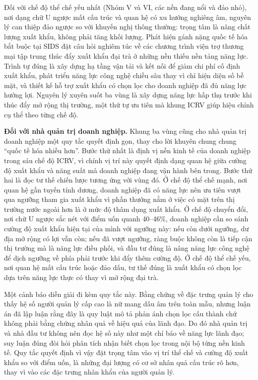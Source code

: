 \documentclass[
  a4paper,
  13pt]{extreport}
\begin{document}
Đối với chế độ thể chế yếu nhất (Nhóm V và VI, các nền đang nổi và đảo
nhỏ), nơi dạng chữ U ngược mất cấu trúc và quan hệ có xu hướng nghiêng
âm, nguyên lý can thiệp đảo ngược so với khuyến nghị thông thường: trọng
tâm là nâng chất lượng xuất khẩu, không phải tăng khối lượng. Phát hiện
gánh nặng quốc tế hóa bắt buộc tại SIDS đặt câu hỏi nghiêm túc về các
chương trình viện trợ thương mại tập trung thúc đẩy xuất khẩu đại trà ở
những nền thiếu nền tảng năng lực. Trình tự đúng là xây dựng hạ tầng vận
tải và kết nối để giảm chi phí cố định xuất khẩu, phát triển năng lực
công nghệ chiều sâu thay vì chỉ hiện diện số bề mặt, và thiết kế hỗ trợ
xuất khẩu có chọn lọc cho doanh nghiệp đã đủ năng lực hưởng lợi. Nguyên
lý xuyên suốt ba vùng là xây dựng năng lực hấp thụ trước khi thúc đẩy mở
rộng thị trường, một thứ tự ưu tiên mà khung ICRV giúp hiệu chỉnh cụ thể
theo từng chế độ.

\textbf{Đối với nhà quản trị doanh nghiệp.} Khung ba vùng cũng cho nhà
quản trị doanh nghiệp một quy tắc quyết định gọn, thay cho lời khuyên
chung chung ``quốc tế hóa nhiều hơn''. Bước thứ nhất là định vị nền kinh
tế của doanh nghiệp trong sáu chế độ ICRV, vì chính vị trí này quyết
định dạng quan hệ giữa cường độ xuất khẩu và năng suất mà doanh nghiệp
đang vận hành bên trong. Bước thứ hai là đọc tư thế chiến lược tương ứng
với vùng đó. Ở chế độ thể chế mạnh, nơi quan hệ gần tuyến tính dương,
doanh nghiệp đã có năng lực nên ưu tiên vượt qua ngưỡng tham gia xuất
khẩu vì phần thưởng nằm ở việc có mặt trên thị trường nước ngoài hơn là
ở mức độ thâm dụng xuất khẩu. Ở chế độ chuyển đổi, nơi chữ U ngược sắc
nét với điểm uốn quanh 40--46\%, doanh nghiệp cần so sánh cường độ xuất
khẩu hiện tại của mình với ngưỡng này: nếu còn dưới ngưỡng, dư địa mở
rộng có lợi vẫn còn; nếu đã vượt ngưỡng, ràng buộc không còn là tiếp cận
thị trường mà là năng lực điều phối, và đầu tư đúng là nâng năng lực
công nghệ để dịch ngưỡng về phía phải trước khi đẩy thêm cường độ. Ở chế
độ thể chế yếu, nơi quan hệ mất cấu trúc hoặc đảo dấu, tư thế đúng là
xuất khẩu có chọn lọc dựa trên năng lực thực có thay vì mở rộng đại trà.

Một cảnh báo diễn giải đi kèm quy tắc này. Bằng chứng về đặc trưng quản
lý cho thấy hệ số người quản lý cấp cao là nữ mang dấu âm trên toàn mẫu,
nhưng luận án đã lập luận rằng đây là quy luật mô tả phản ánh chọn lọc
cấu thành chứ không phải bằng chứng nhân quả về hiệu quả của lãnh đạo.
Do đó nhà quản trị và nhà đầu tư không nên đọc hệ số này như một chỉ báo
về năng lực lãnh đạo; suy luận đúng đòi hỏi phân tích nhận biết chọn lọc
trong nội bộ từng nền kinh tế. Quy tắc quyết định vì vậy đặt trọng tâm
vào vị trí thể chế và cường độ xuất khẩu so với điểm uốn, là những đại
lượng có cơ sở nhân quả cấu trúc rõ hơn, thay vì vào các đặc trưng nhân
khẩu của người quản lý.
\end{document}
